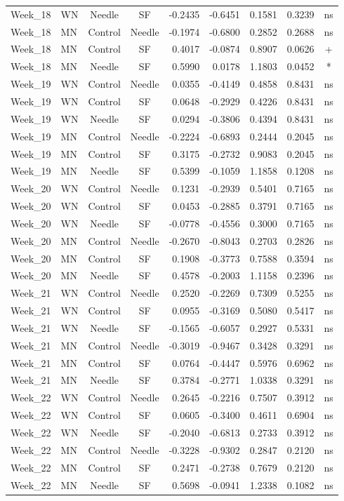 \documentclass[
  12pt,
  letterpaper,
]{article}
\begin{document}
\begin{longtable}{llccrrrlc}
Week\_18 & WN & Needle & SF & -0.2435 & -0.6451 & 0.1581 & 0.3239 & ns \\ 
Week\_18 & MN & Control & Needle & -0.1974 & -0.6800 & 0.2852 & 0.2688 & ns \\ 
Week\_18 & MN & Control & SF & 0.4017 & -0.0874 & 0.8907 & 0.0626 & + \\ 
Week\_18 & MN & Needle & SF & 0.5990 & 0.0178 & 1.1803 & 0.0452 & * \\ 
Week\_19 & WN & Control & Needle & 0.0355 & -0.4149 & 0.4858 & 0.8431 & ns \\ 
Week\_19 & WN & Control & SF & 0.0648 & -0.2929 & 0.4226 & 0.8431 & ns \\ 
Week\_19 & WN & Needle & SF & 0.0294 & -0.3806 & 0.4394 & 0.8431 & ns \\ 
Week\_19 & MN & Control & Needle & -0.2224 & -0.6893 & 0.2444 & 0.2045 & ns \\ 
Week\_19 & MN & Control & SF & 0.3175 & -0.2732 & 0.9083 & 0.2045 & ns \\ 
Week\_19 & MN & Needle & SF & 0.5399 & -0.1059 & 1.1858 & 0.1208 & ns \\ 
Week\_20 & WN & Control & Needle & 0.1231 & -0.2939 & 0.5401 & 0.7165 & ns \\ 
Week\_20 & WN & Control & SF & 0.0453 & -0.2885 & 0.3791 & 0.7165 & ns \\ 
Week\_20 & WN & Needle & SF & -0.0778 & -0.4556 & 0.3000 & 0.7165 & ns \\ 
Week\_20 & MN & Control & Needle & -0.2670 & -0.8043 & 0.2703 & 0.2826 & ns \\ 
Week\_20 & MN & Control & SF & 0.1908 & -0.3773 & 0.7588 & 0.3594 & ns \\ 
Week\_20 & MN & Needle & SF & 0.4578 & -0.2003 & 1.1158 & 0.2396 & ns \\ 
Week\_21 & WN & Control & Needle & 0.2520 & -0.2269 & 0.7309 & 0.5255 & ns \\ 
Week\_21 & WN & Control & SF & 0.0955 & -0.3169 & 0.5080 & 0.5417 & ns \\ 
Week\_21 & WN & Needle & SF & -0.1565 & -0.6057 & 0.2927 & 0.5331 & ns \\ 
Week\_21 & MN & Control & Needle & -0.3019 & -0.9467 & 0.3428 & 0.3291 & ns \\ 
Week\_21 & MN & Control & SF & 0.0764 & -0.4447 & 0.5976 & 0.6962 & ns \\ 
Week\_21 & MN & Needle & SF & 0.3784 & -0.2771 & 1.0338 & 0.3291 & ns \\ 
Week\_22 & WN & Control & Needle & 0.2645 & -0.2216 & 0.7507 & 0.3912 & ns \\ 
Week\_22 & WN & Control & SF & 0.0605 & -0.3400 & 0.4611 & 0.6904 & ns \\ 
Week\_22 & WN & Needle & SF & -0.2040 & -0.6813 & 0.2733 & 0.3912 & ns \\ 
Week\_22 & MN & Control & Needle & -0.3228 & -0.9302 & 0.2847 & 0.2120 & ns \\ 
Week\_22 & MN & Control & SF & 0.2471 & -0.2738 & 0.7679 & 0.2120 & ns \\ 
Week\_22 & MN & Needle & SF & 0.5698 & -0.0941 & 1.2338 & 0.1082 & ns \\ 
\bottomrule
\end{longtable}
\end{document}
